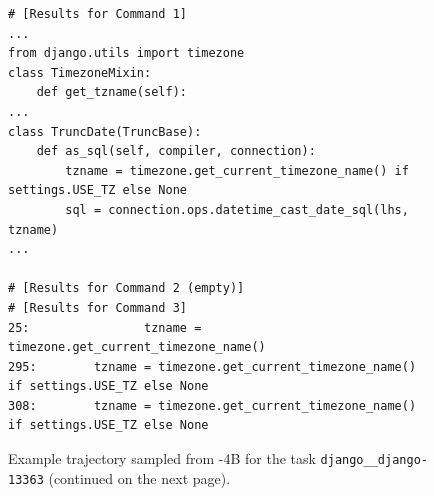 \begin{figure}[!ht]
\begin{tcolorbox}[colback=orange!5!white, colframe=orange!75!black, title={\small Observation 2 (trimmed)}]
\begin{lstlisting}[basicstyle=\fontsize{7.5}{8.5}\ttfamily, breaklines=true]
# [Results for Command 1]
...
from django.utils import timezone
class TimezoneMixin:
    def get_tzname(self):
...
class TruncDate(TruncBase):
    def as_sql(self, compiler, connection):
        tzname = timezone.get_current_timezone_name() if settings.USE_TZ else None
        sql = connection.ops.datetime_cast_date_sql(lhs, tzname)
...

# [Results for Command 2 (empty)]
# [Results for Command 3]
25:                tzname = timezone.get_current_timezone_name()
295:        tzname = timezone.get_current_timezone_name() if settings.USE_TZ else None
308:        tzname = timezone.get_current_timezone_name() if settings.USE_TZ else None
\end{lstlisting}
\end{tcolorbox}
\caption{Example trajectory sampled from \methodname-4B for the task \texttt{django\_\_django-13363} (continued on the next page).}
\label{fig:traj_4b_p1}
\end{figure}


